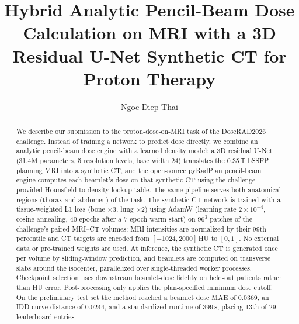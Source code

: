 \documentclass[runningheads]{llncs}
\begin{document}
\title{Hybrid Analytic Pencil-Beam Dose Calculation on MRI with a 3D Residual U-Net Synthetic CT for Proton Therapy}

\author{Ngoc Diep Thai}

\maketitle

\begin{abstract}
We describe our submission to the proton-dose-on-MRI task of the DoseRAD2026 challenge. Instead of training a network to predict dose directly, we combine an analytic pencil-beam dose engine with a learned density model: a 3D residual U-Net (31.4M parameters, 5 resolution levels, base width 24) translates the 0.35\,T bSSFP planning MRI into a synthetic CT, and the open-source pyRadPlan pencil-beam engine computes each beamlet's dose on that synthetic CT using the challenge-provided Hounsfield-to-density lookup table. The same pipeline serves both anatomical regions (thorax and abdomen) of the task. The synthetic-CT network is trained with a tissue-weighted L1 loss (bone $\times$3, lung $\times$2) using AdamW (learning rate $2\times10^{-4}$, cosine annealing, 40 epochs after a 7-epoch warm start) on $96^3$ patches of the challenge's paired MRI--CT volumes; MRI intensities are normalized by their 99th percentile and CT targets are encoded from $[-1024, 2000]$\,HU to $[0,1]$. No external data or pre-trained weights are used. At inference, the synthetic CT is generated once per volume by sliding-window prediction, and beamlets are computed on transverse slabs around the isocenter, parallelized over single-threaded worker processes. Checkpoint selection uses downstream beamlet-dose fidelity on held-out patients rather than HU error. Post-processing only applies the plan-specified minimum dose cutoff. On the preliminary test set the method reached a beamlet dose MAE of 0.0369, an IDD curve distance of 0.0244, and a standardized runtime of 399\,s, placing 13th of 29 leaderboard entries.
\end{abstract}
\end{document}
